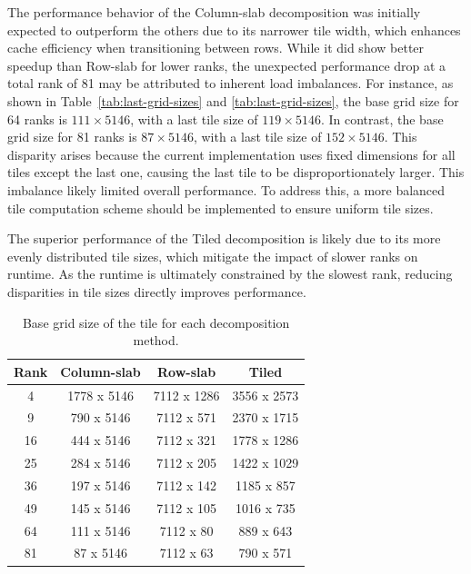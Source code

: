 The performance behavior of the Column-slab decomposition was initially expected to outperform the others due to its narrower tile width, which enhances cache efficiency when transitioning between rows. While it did show better speedup than Row-slab for lower ranks, the unexpected performance drop at a total rank of 81 may be attributed to inherent load imbalances. For instance, as shown in Table~\ref{tab:last-grid-sizes} and \ref{tab:last-grid-sizes}, the base grid size for 64 ranks is \(111 \times 5146\), with a last tile size of \(119 \times 5146\). In contrast, the base grid size for 81 ranks is \(87 \times 5146\), with a last tile size of \(152 \times 5146\). This disparity arises because the current implementation uses fixed dimensions for all tiles except the last one, causing the last tile to be disproportionately larger. This imbalance likely limited overall performance. To address this, a more balanced tile computation scheme should be implemented to ensure uniform tile sizes.

The superior performance of the Tiled decomposition is likely due to its more evenly distributed tile sizes, which mitigate the impact of slower ranks on runtime. As the runtime is ultimately constrained by the slowest rank, reducing disparities in tile sizes directly improves performance.

\begin{table}
    \centering
    \begin{tabular}{c|c|c|c}
        \textbf{Rank} & \textbf{Column-slab} & \textbf{Row-slab} & \textbf{Tiled} \\
        \hline
        4  & 1778 x 5146& 7112 x 1286& 3556 x 2573\\
        9  & 790 x 5146& 7112 x 571& 2370 x 1715\\
        16 & 444 x 5146& 7112 x 321& 1778 x 1286\\
        25 & 284 x 5146& 7112 x 205& 1422 x 1029\\
        36 & 197 x 5146& 7112 x 142& 1185 x 857\\
        49 & 145 x 5146& 7112 x 105& 1016 x 735\\
        64 & 111 x 5146& 7112 x 80& 889 x 643\\
        81 & 87 x 5146& 7112 x 63& 790 x 571\\
    \end{tabular}
    \caption{Base grid size of the tile for each decomposition method.}
    \label{tab:base-grid-sizes}
\end{table}

